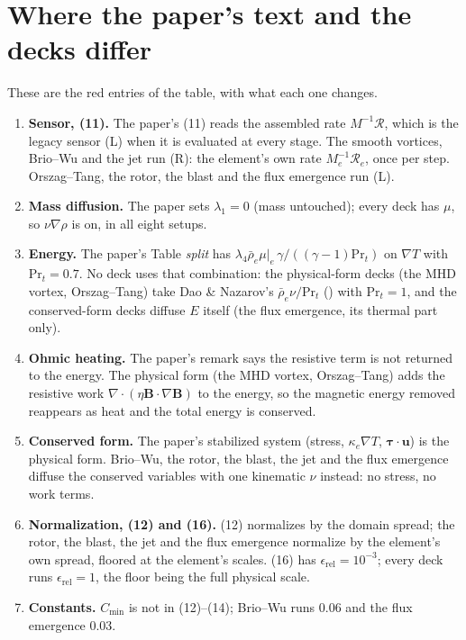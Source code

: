 \documentclass[10pt]{article}
\newcommand{\vv}{\bm{u}}
\newcommand{\BB}{\bm{B}}
\newcommand{\erel}{\epsilon_{\mathrm{rel}}}
\begin{document}
\section*{Where the paper's text and the decks differ}
These are the red entries of the table, with what each one changes.
\begin{enumerate}[leftmargin=*]
\item \textbf{Sensor, (11).} The paper's (11) reads the assembled rate $M^{-1}\mathcal{R}$, which is the legacy sensor (L) when
it is evaluated at every stage. The smooth vortices, Brio--Wu and the jet run (R): the element's own rate $M_e^{-1}\mathcal{R}_e$,
once per step. Orszag--Tang, the rotor, the blast and the flux emergence run (L).
\item \textbf{Mass diffusion.} The paper sets $\lambda_1=0$ (mass untouched); every deck has \code{:}$\mu$, so $\nu\nabla\rho$
is on, in all eight setups.
\item \textbf{Energy.} The paper's Table \emph{split} has $\lambda_4\bar\rho_e\mu|_e\,\gamma/((\gamma-1)\mathrm{Pr}_t)$ on
$\nabla T$ with $\mathrm{Pr}_t=0.7$. No deck uses that combination: the physical-form decks (the MHD vortex, Orszag--Tang) take
Dao \& Nazarov's $\bar\rho_e\nu/\mathrm{Pr}_t$ () with $\mathrm{Pr}_t=1$, and the conserved-form decks
diffuse $E$ itself (the flux emergence, its thermal part only).
\item \textbf{Ohmic heating.} The paper's remark says the resistive term is not returned to the energy. The physical form (the MHD
vortex, Orszag--Tang) adds the resistive work $\nabla\cdot(\eta\BB\cdot\nabla\BB)$ to the energy, so the magnetic energy removed
reappears as heat and the total energy is conserved.
\item \textbf{Conserved form.} The paper's stabilized system (stress, $\kappa_e\nabla T$, $\bm\tau\cdot\vv$) is the physical form.
Brio--Wu, the rotor, the blast, the jet and the flux emergence diffuse the conserved variables with one kinematic $\nu$ instead:
no stress, no work terms.
\item \textbf{Normalization, (12) and (16).} (12) normalizes by the domain spread; the rotor, the blast, the jet and the flux
emergence normalize by the element's own spread, floored at the element's scales. (16) has $\erel=10^{-3}$; every deck runs
$\erel=1$, the floor being the full physical scale.
\item \textbf{Constants.} $C_{\min}$ is not in (12)--(14); Brio--Wu runs 0.06 and the flux emergence 0.03.

\end{enumerate}
\end{document}
